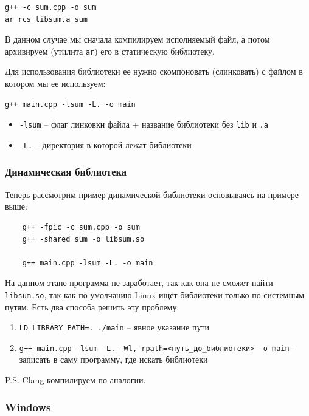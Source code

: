 \begin{verbatim}
g++ -c sum.cpp -o sum
ar rcs libsum.a sum
\end{verbatim}

В данном случае мы сначала компилируем исполняемый файл, а потом архивируем (утилита \texttt{ar}) его в статическую библиотеку.

Для использования библиотеки ее нужно скомпоновать (слинковать) с файлом в котором мы ее используем:
\begin{verbatim}
g++ main.cpp -lsum -L. -o main
\end{verbatim}

\begin{itemize}
    \item \texttt{-lsum} -- флаг линковки файла + название библиотеки без \texttt{lib} и \texttt{.a}
    \item \texttt{-L.} -- директория в которой лежат библиотеки
\end{itemize}

\subsubsection*{Динамическая библиотека}

Теперь рассмотрим пример динамической библиотеки основываясь на примере выше:
\begin{verbatim}
    g++ -fpic -c sum.cpp -o sum
    g++ -shared sum -o libsum.so
    
    g++ main.cpp -lsum -L. -o main
\end{verbatim}

На данном этапе программа не заработает, так как она не сможет найти \texttt{libsum.so}, так как по умолчанию Linux ищет библиотеки только по системным путям. Есть два способа решить эту проблему:

\begin{enumerate}
    \item \texttt{LD\_LIBRARY\_PATH=. ./main} -- явное указание пути
    \item \texttt{g++ main.cpp -lsum -L. -Wl,-rpath=<путь\_до\_библиотеки> -o main} - записать в саму программу, где искать библиотеки
\end{enumerate}

P.S. Clang компилируем по аналогии.

\subsubsection{Windows}


